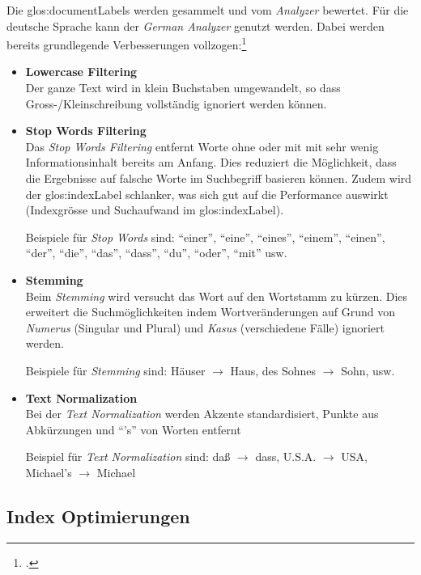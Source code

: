 Die \glspl{glos:documentLabel} werden gesammelt und vom \textit{Analyzer} bewertet. Für die deutsche Sprache kann der \textit{German Analyzer} genutzt werden.
Dabei werden bereits grundlegende Verbesserungen vollzogen:\footcite{Inner_workings_of_the_German_Analyzer_in_Lucene_2016-05-08}
\begin{itemize}
	\item \textbf{Lowercase Filtering}\\
	Der ganze Text wird in klein Buchstaben umgewandelt, so dass Gross-/Kleinschreibung vollständig ignoriert werden können.

	\item \textbf{Stop Words Filtering}\\
	Das \textit{Stop Words Filtering} entfernt Worte ohne oder mit mit sehr wenig Informationsinhalt bereits am Anfang.
	Dies reduziert die Möglichkeit, dass die Ergebnisse auf falsche Worte im Suchbegriff basieren können.
	Zudem wird der \gls{glos:indexLabel} schlanker, was sich gut auf die Performance auswirkt (Indexgrösse und Suchaufwand im \gls{glos:indexLabel}).

	Beispiele für \textit{Stop Words} sind:
	"`einer"', "`eine"', "`eines"', "`einem"', "`einen"', "`der"', "`die"', "`das"', "`dass"', "`du"', "`oder"', "`mit"' usw.

	\item \textbf{Stemming}\\
	Beim \textit{Stemming} wird versucht das Wort auf den Wortstamm zu kürzen.
	Dies erweitert die Suchmöglichkeiten indem Wortveränderungen auf Grund von \textit{Numerus} (Singular und Plural) und \textit{Kasus} (verschiedene Fälle) ignoriert werden.

	Beispiele für \textit{Stemming} sind:
	Häuser $\rightarrow$ Haus, des Sohnes $\rightarrow$ Sohn, usw.

	\item \textbf{Text Normalization}\\
	Bei der \textit{Text Normalization} werden Akzente standardisiert, Punkte aus Abkürzungen und "`'s"' von Worten entfernt

	Beispiel für \textit{Text Normalization} sind:
	daß $\rightarrow$ dass, U.S.A. $\rightarrow$ USA, Michael's $\rightarrow$ Michael

\end{itemize}


\subsection{Index Optimierungen}

